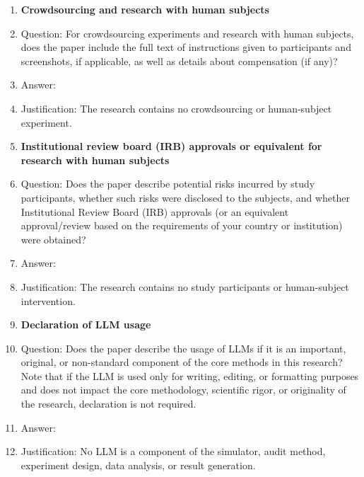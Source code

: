 \begin{enumerate}
\item {\bf Crowdsourcing and research with human subjects}
    \item[] Question: For crowdsourcing experiments and research with human subjects, does the paper include the full text of instructions given to participants and screenshots, if applicable, as well as details about compensation (if any)?
    \item[] Answer: \answerNA{}
    \item[] Justification: The research contains no crowdsourcing or human-subject experiment.

\pagebreak[3]
\item {\bf Institutional review board (IRB) approvals or equivalent for research with human subjects}
    \item[] Question: Does the paper describe potential risks incurred by study participants, whether such risks were disclosed to the subjects, and whether Institutional Review Board (IRB) approvals (or an equivalent approval/review based on the requirements of your country or institution) were obtained?
    \item[] Answer: \answerNA{}
    \item[] Justification: The research contains no study participants or human-subject intervention.

\item {\bf Declaration of LLM usage}
    \item[] Question: Does the paper describe the usage of LLMs if it is an important, original, or non-standard component of the core methods in this research? Note that if the LLM is used only for writing, editing, or formatting purposes and does not impact the core methodology, scientific rigor, or originality of the research, declaration is not required.
    \item[] Answer: \answerNA{}
    \item[] Justification: No LLM is a component of the simulator, audit method, experiment design, data analysis, or result generation.

\end{enumerate}
